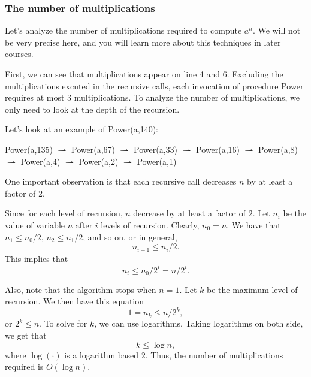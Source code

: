 \begin{frame}\frametitle{The number of multiplications}
  Let's analyze the number of multiplications required to compute
  $a^n$.  We will not be very precise here, and you will learn more
  about this techniques in later courses.

  First, we can see that multiplications appear on line 4 and 6.
  Excluding the multiplications excuted in the recursive calls, each
  invocation of procedure Power requires at most 3 multiplications.
  To analyze the number of multiplications, we only need to look at
  the depth of the recursion.

  Let's look at an example of Power(a,140):

  \begin{tcolorbox} 
    Power(a,135) $\rightharpoonup$ Power(a,67) $\rightharpoonup$
    Power(a,33) $\rightharpoonup$ Power(a,16) $\rightharpoonup$
    Power(a,8) $\rightharpoonup$ Power(a,4) $\rightharpoonup$
    Power(a,2) $\rightharpoonup$ Power(a,1)
  \end{tcolorbox}       
  
  One important observation is that each recursive call decreases $n$
  by at least a factor of 2.
\end{frame}

\begin{frame}
  Since for each level of recursion, $n$ decrease by at least a factor
  of $2$.  Let $n_i$ be the value of variable $n$ after $i$ levels of
  recursion.  Clearly, $n_0=n$.  We have that $n_1\leq n_0/2$,
  $n_2\leq n_1/2$, and so on, or in general,
  \[ n_{i+1}\leq n_i/2. \]
  This implies that
  \[ n_i \leq n_0/2^i = n/2^i. \]

  Also, note that the algorithm stops when $n=1$.  Let $k$ be the
  maximum level of recursion.  We then have this equation
  \[ 1 = n_k \leq n/2^k, \]
  or $2^k\leq n$. To solve for $k$, we can use logarithms.  Taking
  logarithms on both side, we get that
  \[ k \leq \log n, \]
  where $\log(\cdot)$ is a logarithm based 2.  Thus, the number of
  multiplications required is $O(\log n)$.
\end{frame}
 
